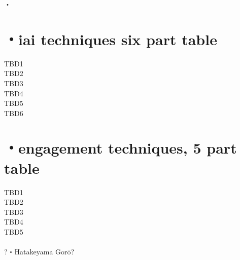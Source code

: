 \documentclass[dvipdfmx, a4paper, 12pt]{utarticle}
\begin{document}
\begin{CJK*}{UTF8}{min}
\begin{landscape}
\setcounter{section}{0}
\newpage
\pagestyle{empty}
・\\
\section{・iai techniques six part table}
\noindent TBD1\\
TBD2\\
TBD3\\
TBD4\\
TBD5\\
TBD6\\
\section{・engagement techniques, 5 part table}
\noindent TBD1\\
TBD2\\
TBD3\\
TBD4\\
TBD5\\
\\
?・Hatakeyama Gor\={o}?

\end{landscape}
\end{CJK*}
\end{document}

